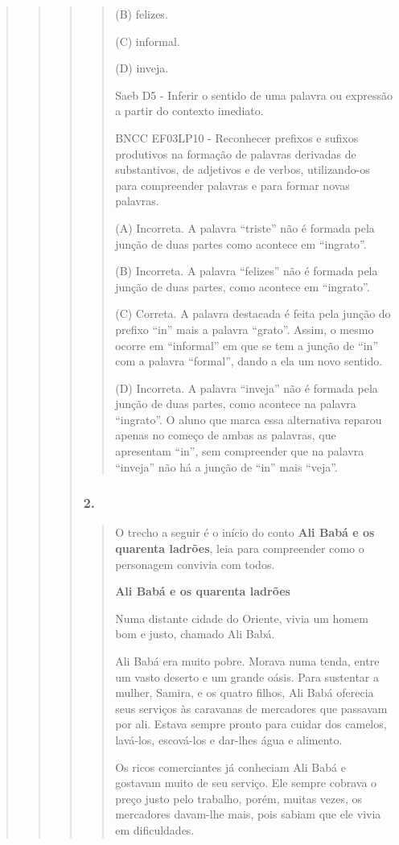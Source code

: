\begin{quote}
\begin{quote}
\begin{quote}
\begin{quote}
(B) felizes.

(C) informal.

(D) inveja.

Saeb D5 - Inferir o sentido de uma palavra ou expressão a partir do
contexto imediato.

BNCC EF03LP10 - Reconhecer prefixos e sufixos produtivos na formação de
palavras derivadas de substantivos, de adjetivos e de verbos,
utilizando-os para compreender palavras e para formar novas palavras.

(A) Incorreta. A palavra ``triste'' não é formada pela junção de duas
partes como acontece em ``ingrato''.

(B) Incorreta. A palavra ``felizes'' não é formada pela junção de duas
partes, como acontece em ``ingrato''.

(C) Correta. A palavra destacada é feita pela junção do prefixo ``in''
mais a palavra ``grato''. Assim, o mesmo ocorre em ``informal'' em que
se tem a junção de ``in'' com a palavra ``formal'', dando a ela um novo
sentido.

(D) Incorreta. A palavra ``inveja'' não é formada pela junção de duas
partes, como acontece na palavra ``ingrato''. O aluno que marca essa
alternativa reparou apenas no começo de ambas as palavras, que
apresentam ``in'', sem compreender que na palavra ``inveja'' não há a
junção de ``in'' mais ``veja''.
\end{quote}

\subsubsection{2. }\label{section-89}

\begin{quote}
O trecho a seguir é o início do conto \textbf{Ali Babá e os quarenta
ladrões}, leia para compreender como o personagem convivia com todos.

\textbf{Ali Babá e os quarenta ladrões}

Numa distante cidade do Oriente, vivia um homem bom e justo, chamado Ali
Babá.

Ali Babá era muito pobre. Morava numa tenda, entre um vasto deserto e um
grande oásis. Para sustentar a mulher, Samira, e os quatro filhos, Ali
Babá oferecia seus serviços às caravanas de mercadores que passavam por
ali. Estava sempre pronto para cuidar dos camelos, lavá-los, escová-los
e dar-lhes água e alimento.

Os ricos comerciantes já conheciam Ali Babá e gostavam muito de seu
serviço. Ele sempre cobrava o preço justo pelo trabalho, porém, muitas
vezes, os mercadores davam-lhe mais, pois sabiam que ele vivia em
dificuldades.


\end{quote}
\end{quote}
\end{quote}
\end{quote}
